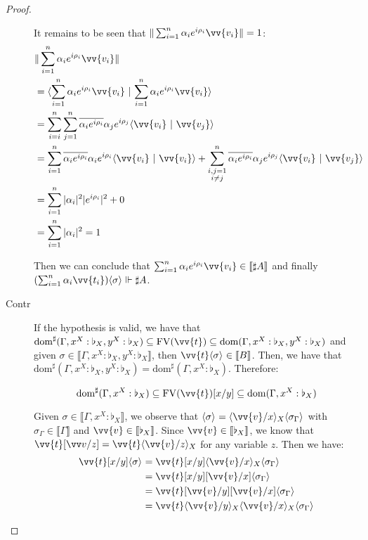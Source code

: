 \documentclass[runningheads,orivec,envcountsame,envcountsect]{llncs}
\newcommand\ansubst[2]{\ensuremath{\langle #1 \rangle_{#2}}}
\newcommand\dom[1]{\mathrm{dom}(#1)}
\newcommand\sdom[1]{\mathrm{dom}^{\sharp}(#1)}
\newcommand\FV[1]{\mathrm{FV}(#1)}
\def\scal#1#2{\langle{#1}~|~{#2}\rangle}
\def\sem#1{\llbracket#1\rrbracket}
\def\real{\Vdash}
\newcommand\basis[1]{\ensuremath{\flat_{#1}}}
\begin{document}
\begin{proof}
\begin{description}
    It remains to be seen that $\|\sum_{i=1}^{n} \alpha_i e^{i\rho_i} \vv{v_i}\|=1$:
    \begin{align*}
    &\|\sum_{i=1}^{n} \alpha_i e^{i\rho_i} \vv{v_i}\| \\
    &=\scal{\sum_{i=1}^{n} \alpha_i e^{i\rho_i}\vv{v_i}}{\sum_{i=1}^{n} \alpha_i e^{i\rho_i} \vv{v_i}}\\
    &= \sum_{i=i}^{n}\sum_{j=1}^{n} \overline{\alpha_i e^{i\rho_i}}\alpha_j e^{i\rho_j} \scal{\vv{v_i}}{\vv{v_j}}\\
    &=\sum_{i=1}^{n} \overline{\alpha_i e^{i\rho_i}}\alpha_i e^{i\rho_i} \scal{\vv{v_i}}{\vv{v_i}} + \sum_{\substack{i,j=1\\i\neq j}}^{n} \overline{\alpha_i e^{i\rho_i}}\alpha_j e^{i\rho_j} \scal{\vv{v_i}}{\vv{v_j}}\\
    &=\sum_{i=1}^{n}|\alpha_i|^2 |e^{i\rho_i}|^2+ 0\\
    &=\sum_{i=1}^{n}|\alpha_i|^2 = 1\\
    \end{align*}

    Then we can conclude that $\sum_{i=1}^{n}\alpha_i e^{i\rho_i}\vv{v_i}\in\sem{\sharp A}$ and finally $(\sum_{i=1}^{n}\alpha_i\vv{t_i})\ansubst{\sigma}{}\real\sharp A$.

    \item[Contr] If the hypothesis is valid, we have that $\sdom{\Gamma, x^X:\basis{X}, y^X:\basis{X}}\subseteq\FV{\vv{t}}\subseteq\dom{\Gamma,x^X:\basis{X}, y^X:\basis{X}}$ and given $\sigma\in\sem{\Gamma, x^X:\basis{X}, y^X:\basis{X}}$, then $\vv{t}\ansubst{\sigma}{}\in\sem{B}$. Then, we have that $\sdom{\Gamma, x^X:\basis{X}, y^X:\basis{X}}=\sdom{\Gamma, x^X:\basis{X}}$. Therefore:
    
    \[
    \sdom{\Gamma, x^X:\basis{X}}\subseteq\FV{\vv{t}}[x/y]\subseteq\dom{\Gamma, x^X:\basis{X}}
    \]

    Given $\sigma\in\sem{\Gamma, x^X:\basis{X}}$, we observe that $\ansubst{\sigma}{}=\ansubst{\vv{v}/x}{X}\ansubst{\sigma_\Gamma}{}$ with $\sigma_\Gamma\in\sem{\Gamma}$ and $\vv{v}\in\sem{\basis{X}}$. Since $\vv{v}\in\sem{\basis{X}}$, we know that $\vv{t}[\vv v/z] =\vv{t}\ansubst{\vv{v}/z}{X}$ for any variable $z$. Then we have:
    \begin{align*}
        \vv{t}[x/y]\ansubst{\sigma}{} &= \vv{t}[x/y]\ansubst{\vv{v}/x}{X}\ansubst{\sigma_\Gamma}{}\\
        &=\vv{t}[x/y][\vv{v}/x]\ansubst{\sigma_\Gamma}{}\\
        &=\vv{t}[\vv{v}/y][\vv{v}/x]\ansubst{\sigma_\Gamma}{}\\
        &=\vv{t}\ansubst{\vv{v}/y}{X}\ansubst{\vv{v}/x}{X}\ansubst{\sigma_\Gamma}{}    
    \end{align*}
    

\end{description}
\end{proof}
\end{document}
